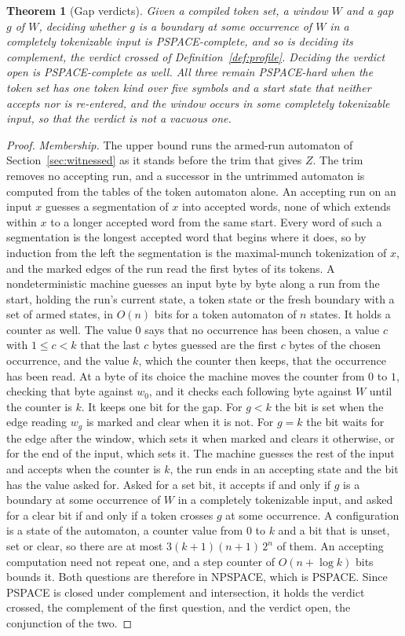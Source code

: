 \documentclass[11pt,a4paper]{article}
\theoremstyle{definition}
\theoremstyle{plain}
\newtheorem{theorem}{Theorem}
\begin{document}
\begin{theorem}[Gap verdicts]
\label{thm:gap-pspace}
Given a compiled token set, a window $W$ and a gap $g$ of $W$, deciding whether $g$ is a boundary at some occurrence of
$W$ in a completely tokenizable input is PSPACE-complete, and so is deciding its complement, the verdict crossed of
Definition~\ref{def:profile}. Deciding the verdict open is PSPACE-complete as well. All three remain PSPACE-hard when
the token set has one token kind over five symbols and a start state that neither accepts nor is re-entered, and the
window occurs in some completely tokenizable input, so that the verdict is not a vacuous one.
\end{theorem}

\begin{proof}
\emph{Membership.} The upper bound runs the armed-run automaton of Section~\ref{sec:witnessed} as it stands before the
trim that gives $Z$. The trim removes no accepting run, and a successor in the untrimmed automaton is computed from the
tables of the token automaton alone. An accepting run on an input $x$ guesses a segmentation of $x$ into accepted words,
none of which extends within $x$ to a longer accepted word from the same start. Every word of such a segmentation is the
longest accepted word that begins where it does, so by induction from the left the segmentation is the maximal-munch
tokenization of $x$, and the marked edges of the run read the first bytes of its tokens. A nondeterministic machine
guesses an input byte by byte along a run from the start, holding the run's current state, a token state or the fresh
boundary with a set of armed states, in $O(n)$ bits for a token automaton of $n$ states. It holds a counter as well. The
value $0$ says that no occurrence has been chosen, a value $c$ with $1 \leq c < k$ that the last $c$ bytes guessed are
the first $c$ bytes of the chosen occurrence, and the value $k$, which the counter then keeps, that the occurrence has
been read. At a byte of its choice the machine moves the counter from $0$ to $1$, checking that byte against $w_0$, and
it checks each following byte against $W$ until the counter is $k$. It keeps one bit for the gap. For $g < k$ the bit is
set when the edge reading $w_g$ is marked and clear when it is not. For $g = k$ the bit waits for the edge after the
window, which sets it when marked and clears it otherwise, or for the end of the input, which sets it. The machine
guesses the rest of the input and accepts when the counter is $k$, the run ends in an accepting state and the bit has
the value asked for. Asked for a set bit, it accepts if and only if $g$ is a boundary at some occurrence of $W$ in a
completely tokenizable input, and asked for a clear bit if and only if a token crosses $g$ at some occurrence. A
configuration is a state of the automaton, a counter value from $0$ to $k$ and a bit that is unset, set or clear, so
there are at most $3 (k + 1)(n + 1)\, 2^n$ of them. An accepting computation need not repeat one, and a step counter of
$O(n + \log k)$ bits bounds it. Both questions are therefore in NPSPACE, which is PSPACE. Since PSPACE is closed under
complement and intersection, it holds the verdict crossed, the complement of the first question, and the verdict open,
the conjunction of the two.


\end{proof}
\end{document}
